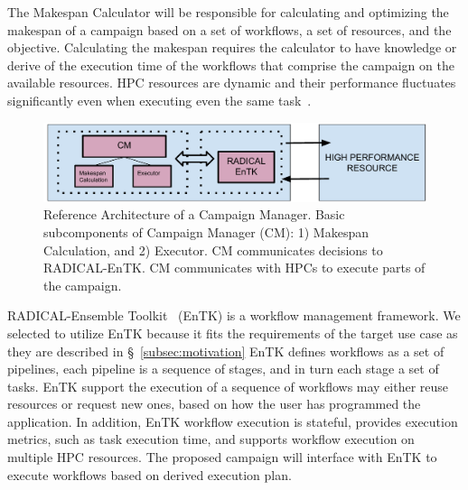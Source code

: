 The Makespan Calculator will be responsible for calculating and optimizing the makespan of a campaign based on a set of workflows, a set of resources, and the objective.
Calculating the makespan requires the calculator to have knowledge or derive of the execution time of the workflows that comprise the campaign on the available resources.
HPC resources are dynamic and their performance fluctuates significantly even when executing even the same task~\cite{pouchard2019computational}.




\begin{figure}[t]
    \centering
    \includegraphics[width=.95\textwidth]{figures/CEM_RefArch.pdf}
    \caption{Reference Architecture of a Campaign Manager. Basic 
    subcomponents of Campaign Manager (CM): 1) Makespan Calculation, and 2) Executor. 
    CM communicates decisions to RADICAL-EnTK. CM communicates with HPCs to 
    execute parts of the campaign.}\label{fig:refarch}
\end{figure}

RADICAL-Ensemble Toolkit~\cite{balasubramanian2018harnessing} (EnTK) is a workflow management framework.
We selected to utilize EnTK because it fits the requirements of the target use case as they are described in \S~\ref{subsec:motivation}
EnTK defines workflows as a set of pipelines, each pipeline is a sequence of stages, and in turn each stage a set of tasks.
EnTK support the execution of a sequence of workflows may either reuse resources or request new ones, based on how the user has programmed the application.
In addition, EnTK workflow execution is stateful, provides execution metrics, such as task execution time, and supports workflow execution on multiple HPC resources.
The proposed campaign will interface with EnTK to execute workflows based on derived execution plan.






